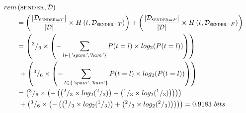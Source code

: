 \documentclass[xcolor={table}]{beamer}
\newcommand{\featN}[1]{\textsc{#1}}
\newcommand{\featL}[1]{\textit{'#1'}}
\begin{document}
 \begin{frame} 
\begin{footnotesize}
\begin{equation*}
\begin{alignedat}{2}
rem&\left(\text{\featN{sender}},\mathcal{D}\right)\\
&= \left(\frac{|\mathcal{D}_{\text{\featN{sender}}=T}|}{|\mathcal{D}|} \times H\left(t,\mathcal{D}_{\text{\featN{sender}}=T}\right) \right) + \left(\frac{|\mathcal{D}_{\text{\featN{sender}}=F}|}{|\mathcal{D}|} \times H\left(t,\mathcal{D}_{\text{\featN{sender}}=F}\right) \right) \\
&= \left(^3/_6 \times \left(-\sum_{l \in \{\text{\featL{spam}},\text{\featL{ham}}\}} P(t=l) \times log_2(P(t=l))\right) \right) \\
&~+ \left( ^3/_6 \times \left(-\sum_{l \in \{\text{\featL{spam}},\text{\featL{ham}}\}} P(t=l) \times log_2(P(t=l)) \right)\right)\\
&=
\left(
^3/_6 \times
\left( - \left(
\left( ^2/_3 \times log_2( ^2/_3) \right)
+
\left( ^1/_3 \times log_2( ^1/_3) \right)
\right)
\right)
\right)
\\
&~+
\left( ^3/_6 \times
\left( - \left(
\left( ^1/_3 \times log_2( ^1/_3) \right)
+
\left( ^2/_3 \times log_2( ^2/_3) \right)
\right)
\right)
\right) = 0.9183~bits
\end{alignedat}
\label{eq:remainderus}
\end{equation*}
\end{footnotesize}
\end{frame} 
\end{document}
